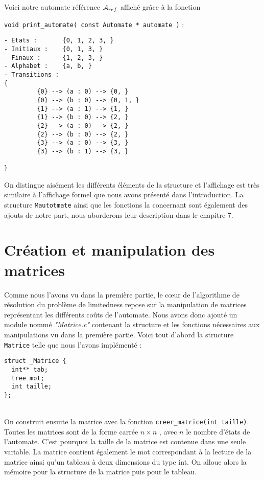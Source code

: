 \documentclass{report}
\begin{document}
Voici notre automate référence $\mathcal{A}_{ref}$ affiché grâce à la fonction
\begin{center}
\verb?void print_automate( const Automate * automate )? :\\ 
\end{center}

\begin{verbatim}
- Etats :       {0, 1, 2, 3, }
- Initiaux :    {0, 1, 3, }
- Finaux :      {1, 2, 3, }
- Alphabet :    {a, b, }
- Transitions : 
{
         {0} --> (a : 0) --> {0, }
         {0} --> (b : 0) --> {0, 1, }
         {1} --> (a : 1) --> {1, }
         {1} --> (b : 0) --> {2, }
         {2} --> (a : 0) --> {2, }
         {2} --> (b : 0) --> {2, }
         {3} --> (a : 0) --> {3, }
         {3} --> (b : 1) --> {3, }
  
}
\end{verbatim}
$ $\\

On distingue aisément les différents éléments de la structure et l'affichage est très similaire à l'affichage formel que nous avons présenté dans l'introduction. La structure \verb?Mautotmate? ainsi que les fonctions la concernant sont également des ajouts de notre part, nous aborderons leur description dans le chapitre 7.

\chapter{Création et manipulation des matrices}

Comme nous l'avons vu dans la première partie, le cœur de l'algorithme de résolution du problème de limitedness repose sur la manipulation de matrices représentant les différents coûts de l'automate. Nous avons donc ajouté un module nommé \textit{"Matrice.c"} contenant la structure et les fonctions nécessaires aux manipulations vu dans la première partie. Voici tout d'abord la structure \verb?Matrice? telle que nous l'avons implémenté : \\

\begin{lstlisting}[frame=single]
struct _Matrice {
  int** tab;
  tree mot;
  int taille;
};
\end{lstlisting}
$ $\\\\
On construit ensuite la matrice avec la fonction \verb?creer_matrice(int taille)?. Toutes les matrices sont de la forme carrée $n \times n$ , avec $n$ le nombre d'états de l'automate. C'est pourquoi la taille de la matrice est contenue dans une seule variable. La matrice contient également le mot correspondant à la lecture de la matrice ainsi qu'un tableau à deux dimensions du type int. On alloue alors la mémoire pour la structure de la matrice puis pour le tableau.\\
\end{document}
